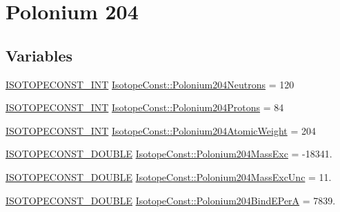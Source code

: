 \hypertarget{group___isotope_const-_polonium-_po204}{}\section{Polonium 204}
\label{group___isotope_const-_polonium-_po204}
\subsection*{Variables}
\begin{DoxyCompactItemize}
\item 
\mbox{\hyperlink{group___isotope_const-_macros_ga5f18360b3e99483a35c32d789e62621c}{I\+S\+O\+T\+O\+P\+E\+C\+O\+N\+S\+T\+\_\+\+I\+NT}} \mbox{\hyperlink{group___isotope_const-_polonium-_po204_ga30abcdd1a0dcdd8eb8d7f76cf4bbdb66}{Isotope\+Const\+::\+Polonium204\+Neutrons}} = 120
\item 
\mbox{\hyperlink{group___isotope_const-_macros_ga5f18360b3e99483a35c32d789e62621c}{I\+S\+O\+T\+O\+P\+E\+C\+O\+N\+S\+T\+\_\+\+I\+NT}} \mbox{\hyperlink{group___isotope_const-_polonium-_po204_ga4f330a2e2a2244c34d87a947978771e5}{Isotope\+Const\+::\+Polonium204\+Protons}} = 84
\item 
\mbox{\hyperlink{group___isotope_const-_macros_ga5f18360b3e99483a35c32d789e62621c}{I\+S\+O\+T\+O\+P\+E\+C\+O\+N\+S\+T\+\_\+\+I\+NT}} \mbox{\hyperlink{group___isotope_const-_polonium-_po204_gaa1d5c35ea830d776ca6df4ce03b7891a}{Isotope\+Const\+::\+Polonium204\+Atomic\+Weight}} = 204
\item 
\mbox{\hyperlink{group___isotope_const-_macros_ga8f45a7272ce02c0b4c65c44636ed719a}{I\+S\+O\+T\+O\+P\+E\+C\+O\+N\+S\+T\+\_\+\+D\+O\+U\+B\+LE}} \mbox{\hyperlink{group___isotope_const-_polonium-_po204_gad77a738fce09d572a5e723b055902d64}{Isotope\+Const\+::\+Polonium204\+Mass\+Exc}} = -\/18341.
\item 
\mbox{\hyperlink{group___isotope_const-_macros_ga8f45a7272ce02c0b4c65c44636ed719a}{I\+S\+O\+T\+O\+P\+E\+C\+O\+N\+S\+T\+\_\+\+D\+O\+U\+B\+LE}} \mbox{\hyperlink{group___isotope_const-_polonium-_po204_ga5f260ecbc705d9eacb0f51855bdbae01}{Isotope\+Const\+::\+Polonium204\+Mass\+Exc\+Unc}} = 11.
\item 
\mbox{\hyperlink{group___isotope_const-_macros_ga8f45a7272ce02c0b4c65c44636ed719a}{I\+S\+O\+T\+O\+P\+E\+C\+O\+N\+S\+T\+\_\+\+D\+O\+U\+B\+LE}} \mbox{\hyperlink{group___isotope_const-_polonium-_po204_ga8c2d0d0dafac93354d090166be103663}{Isotope\+Const\+::\+Polonium204\+Bind\+E\+PerA}} = 7839.
\item 

\end{DoxyCompactItemize}
